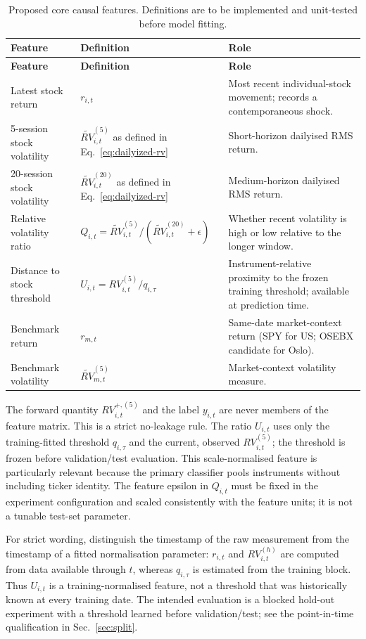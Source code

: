 \documentclass[11pt,a4paper]{article}
\begin{document}
\begin{longtable}{p{2.8cm}p{6.2cm}p{5.8cm}}
\caption{Proposed core causal features. Definitions are to be implemented and unit-tested before model fitting.}\label{tab:features}\\
\toprule
\textbf{Feature} & \textbf{Definition} & \textbf{Role}\\
\midrule
\endfirsthead
\toprule
\textbf{Feature} & \textbf{Definition} & \textbf{Role}\\
\midrule
\endhead
Latest stock return & $r_{i,t}$ & Most recent individual-stock movement; records a contemporaneous shock.\\
5-session stock volatility & $\widetilde{RV}_{i,t}^{(5)}$ as defined in Eq.~\eqref{eq:dailyized-rv} & Short-horizon dailyised RMS return.\\
20-session stock volatility & $\widetilde{RV}_{i,t}^{(20)}$ as defined in Eq.~\eqref{eq:dailyized-rv} & Medium-horizon dailyised RMS return.\\
Relative volatility ratio & $Q_{i,t}=\widetilde{RV}_{i,t}^{(5)}/(\widetilde{RV}_{i,t}^{(20)}+\epsilon)$ & Whether recent volatility is high or low relative to the longer window.\\
Distance to stock threshold & $U_{i,t}=RV_{i,t}^{(5)}/q_{i,\tau}$ & Instrument-relative proximity to the frozen training threshold; available at prediction time.\\
Benchmark return & $r_{m,t}$ & Same-date market-context return (SPY for US; OSEBX candidate for Oslo).\\
Benchmark volatility & $\widetilde{RV}_{m,t}^{(5)}$ & Market-context volatility measure.\\
\bottomrule
\end{longtable}

The forward quantity $RV_{i,t}^{+,(5)}$ and the label $y_{i,t}$ are never members of the feature matrix. This is a strict no-leakage rule. The ratio $U_{i,t}$ uses only the training-fitted threshold $q_{i,\tau}$ and the current, observed $RV_{i,t}^{(5)}$; the threshold is frozen before validation/test evaluation. This scale-normalised feature is particularly relevant because the primary classifier pools instruments without including ticker identity. The feature epsilon in $Q_{i,t}$ must be fixed in the experiment configuration and scaled consistently with the feature units; it is not a tunable test-set parameter.

For strict wording, distinguish the timestamp of the raw measurement from the timestamp of a fitted normalisation parameter: $r_{i,t}$ and $RV_{i,t}^{(h)}$ are computed from data available through $t$, whereas $q_{i,\tau}$ is estimated from the training block. Thus $U_{i,t}$ is a training-normalised feature, not a threshold that was historically known at every training date. The intended evaluation is a blocked hold-out experiment with a threshold learned before validation/test; see the point-in-time qualification in Sec.~\ref{sec:split}.
\end{document}
